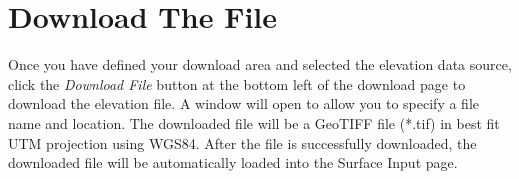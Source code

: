 \documentclass[12pt]{article}
\begin{document}
\section*{Download The File}
Once you have defined your download area and selected the elevation data source, click the \textit{Download File} button at the bottom left of the download page to download the elevation file.  
A window will open to allow you to specify a file name and location. 
The downloaded file will be a GeoTIFF file (*.tif) in best fit UTM projection using WGS84. 
After the file is successfully downloaded, the downloaded file will be automatically loaded into the Surface Input page. 
\end{document}
